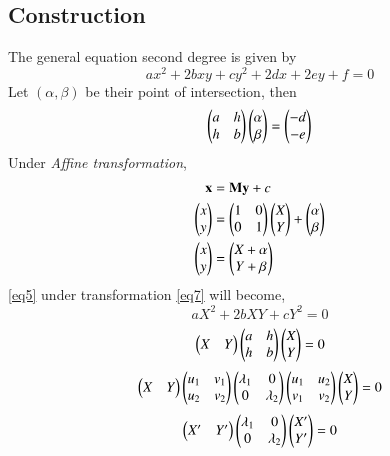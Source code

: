 \documentclass[journal,12pt,twocolumn]{IEEEtran}
\begin{document}
\subsection{Construction}
The general equation second degree is given by
\begin{equation}\label{eq5}
	ax^2 + 2bxy + cy^2 + 2dx + 2ey + f = 0
\end{equation}
Let $(\alpha,\beta)$ be their point of intersection, then
\begin{equation}\label{eq6}
	\begin{pmatrix} a & h\\ h & b\end{pmatrix}\begin{pmatrix}\alpha \\ \beta\end{pmatrix} = \begin{pmatrix}-d \\ -e\end{pmatrix}
\end{equation}
Under \textit{Affine transformation},
\begin{align}
	\mathbf{x} &= \mathbf{M}\mathbf{y} + c\\
	\begin{pmatrix}x \\ y\end{pmatrix} &= \begin{pmatrix}1 & 0 \\ 0 & 1\end{pmatrix} \begin{pmatrix}X \\ Y\end{pmatrix} + \begin{pmatrix}\alpha \\ \beta\end{pmatrix}\\
	\label{eq7}\begin{pmatrix}x \\ y\end{pmatrix} &= \begin{pmatrix}X+\alpha \\ Y+\beta\end{pmatrix}
\end{align}
\eqref{eq5} under transformation \eqref{eq7} will become,
\begin{equation}\label{eq8}
	aX^2 + 2bXY + cY^2 = 0
\end{equation}
\begin{equation}\label{eq9}
	\begin{pmatrix}X & Y\end{pmatrix} \begin{pmatrix}a & h \\ h & b\end{pmatrix} \begin{pmatrix}X \\ Y\end{pmatrix} = 0
\end{equation}
\begin{equation}\label{eq11}
	\begin{pmatrix}X & Y\end{pmatrix} \begin{pmatrix}u_1 & v_1 \\ u_2 & v_2\end{pmatrix} \begin{pmatrix}\lambda_1 & 0\\ 0 & \lambda_2\end{pmatrix} \begin{pmatrix}u_1 & u_2 \\ v_1 & v_2\end{pmatrix} \begin{pmatrix}X \\ Y\end{pmatrix} = 0
\end{equation}
\begin{equation}\label{eq12}
	\begin{pmatrix}X^\prime & Y^\prime\end{pmatrix}  \begin{pmatrix}\lambda_1 & 0\\ 0 & \lambda_2\end{pmatrix} \begin{pmatrix}X^\prime \\ Y^\prime\end{pmatrix} = 0
\end{equation}
\end{document}
